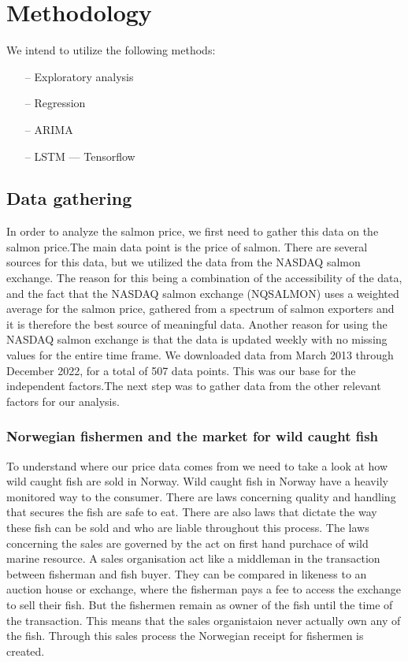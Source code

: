 \section{Methodology}\label{sec:methodology}

We intend to utilize the following methods:
\begin{itemize}
    \item[--] Exploratory analysis
    \item[--] Regression
    \item[--] ARIMA
    \item[--] LSTM --- Tensorflow
    \end{itemize}

\subsection{Data gathering}
In order to analyze the salmon price, we first need to gather this data on the salmon price.The main data point is the price of salmon. There are several sources for this data, but we utilized the data from the NASDAQ salmon exchange. The reason for this being a combination of the accessibility of the data, and the fact that the NASDAQ salmon exchange (NQSALMON) uses a weighted average for the salmon price, gathered from a spectrum of salmon exporters and it is therefore the best source of meaningful data. Another reason for using the NASDAQ salmon exchange is that the data is updated weekly with no missing values for the entire time frame. We downloaded data from March 2013 through December 2022, for a total of 507 data points. This was our base for the independent factors.The next step was to gather data from the other relevant factors for our analysis. 

\subsubsection{Norwegian fishermen and the market for wild caught fish}\label{Norwegian fishermen and the market for wild caught fish}
To understand where our price data comes from we need to take a look at how wild caught fish are sold in Norway. Wild caught fish in Norway have a heavily monitored way to the consumer. There are laws concerning quality and handling that secures the fish are safe to eat. There are also laws that dictate the way these fish can be sold and who are liable throughout this process. The laws concerning the sales are governed by the act on first hand purchace of wild marine resource. A sales organisation act like a middleman in the transaction between fisherman and fish buyer. They can be compared in likeness to an auction house or exchange, where the fisherman pays a fee to access the exchange to sell their fish. But the fishermen remain as owner of the fish until the time of the transaction. This means that the sales organistaion never actually own any of the fish. Through this sales process the Norwegian receipt for fishermen is created.\parencite{Nielsen_2022}

